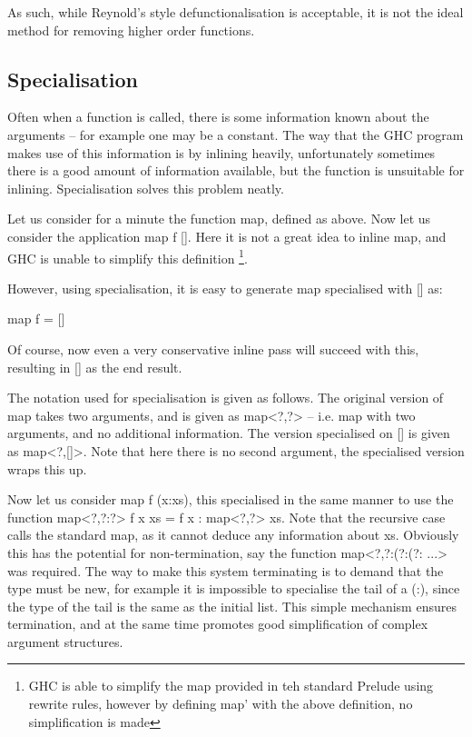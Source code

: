 \documentclass[preprint]{sigplanconf}
\begin{document}
As such, while Reynold's style defunctionalisation is acceptable, it is not the
ideal method for removing higher order functions.

\subsection{Specialisation}

Often when a function is called, there is some information known about the
arguments -- for example one may be a constant. The way that the GHC program
makes use of this information is by inlining heavily, unfortunately sometimes
there is a good amount of information available, but the function is unsuitable
for inlining. Specialisation solves this problem neatly.

Let us consider for a minute the function map, defined as above. Now let us
consider the application map f []. Here it is not a great idea to inline map,
and GHC is unable to simplify this definition \footnote{GHC is able to simplify
the map provided in teh standard Prelude using rewrite rules, however by
defining map' with the above definition, no simplification is made}.

However, using specialisation, it is easy to generate map specialised with []
as:

map f = []

Of course, now even a very conservative inline pass will succeed with this,
resulting in [] as the end result.

The notation used for specialisation is given as follows. The original version
of map takes two arguments, and is given as map<?,?> -- i.e. map with two
arguments, and no additional information. The version specialised on [] is
given as map<?,[]>. Note that here there is no second argument, the specialised
version wraps this up.

Now let us consider map f (x:xs), this specialised in the same manner to use
the function map<?,?:?> f x xs = f x : map<?,?> xs. Note that the recursive
case calls the standard map, as it cannot deduce any information about xs.
Obviously this has the potential for non-termination, say the function
map<?,?:(?:(?: ...> was required. The way to make this system terminating is to
demand that the type must be new, for example it is impossible to specialise
the tail of a (:), since the type of the tail is the same as the initial list.
This simple mechanism ensures termination, and at the same time promotes good
simplification of complex argument structures.
\end{document}
